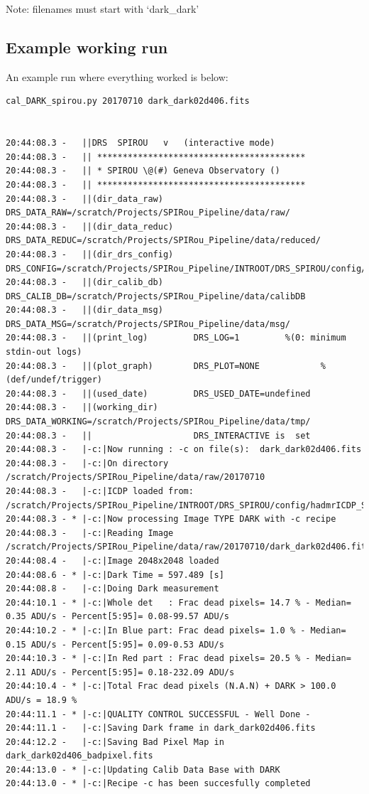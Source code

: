\noindent Note: filenames must start with `dark\_dark'

\subsection{Example working run}

An example run where everything worked is below:

\begin{lstlisting}[style=text]
cal_DARK_spirou.py 20170710 dark_dark02d406.fits


20:44:08.3 -   ||DRS  SPIROU   v   (interactive mode)
20:44:08.3 -   || *****************************************
20:44:08.3 -   || * SPIROU \@(#) Geneva Observatory ()
20:44:08.3 -   || *****************************************
20:44:08.3 -   ||(dir_data_raw)      DRS_DATA_RAW=/scratch/Projects/SPIRou_Pipeline/data/raw/
20:44:08.3 -   ||(dir_data_reduc)    DRS_DATA_REDUC=/scratch/Projects/SPIRou_Pipeline/data/reduced/
20:44:08.3 -   ||(dir_drs_config)    DRS_CONFIG=/scratch/Projects/SPIRou_Pipeline/INTROOT/DRS_SPIROU/config/
20:44:08.3 -   ||(dir_calib_db)      DRS_CALIB_DB=/scratch/Projects/SPIRou_Pipeline/data/calibDB
20:44:08.3 -   ||(dir_data_msg)      DRS_DATA_MSG=/scratch/Projects/SPIRou_Pipeline/data/msg/
20:44:08.3 -   ||(print_log)         DRS_LOG=1         %(0: minimum stdin-out logs)
20:44:08.3 -   ||(plot_graph)        DRS_PLOT=NONE            %(def/undef/trigger)
20:44:08.3 -   ||(used_date)         DRS_USED_DATE=undefined
20:44:08.3 -   ||(working_dir)       DRS_DATA_WORKING=/scratch/Projects/SPIRou_Pipeline/data/tmp/
20:44:08.3 -   ||                    DRS_INTERACTIVE is  set
20:44:08.3 -   |-c:|Now running : -c on file(s):  dark_dark02d406.fits
20:44:08.3 -   |-c:|On directory /scratch/Projects/SPIRou_Pipeline/data/raw/20170710
20:44:08.3 -   |-c:|ICDP loaded from: /scratch/Projects/SPIRou_Pipeline/INTROOT/DRS_SPIROU/config/hadmrICDP_SPIROU.py
20:44:08.3 - * |-c:|Now processing Image TYPE DARK with -c recipe
20:44:08.3 -   |-c:|Reading Image /scratch/Projects/SPIRou_Pipeline/data/raw/20170710/dark_dark02d406.fits
20:44:08.4 -   |-c:|Image 2048x2048 loaded
20:44:08.6 - * |-c:|Dark Time = 597.489 [s]
20:44:08.8 -   |-c:|Doing Dark measurement
20:44:10.1 - * |-c:|Whole det   : Frac dead pixels= 14.7 % - Median= 0.35 ADU/s - Percent[5:95]= 0.08-99.57 ADU/s
20:44:10.2 - * |-c:|In Blue part: Frac dead pixels= 1.0 % - Median= 0.15 ADU/s - Percent[5:95]= 0.09-0.53 ADU/s
20:44:10.3 - * |-c:|In Red part : Frac dead pixels= 20.5 % - Median= 2.11 ADU/s - Percent[5:95]= 0.18-232.09 ADU/s
20:44:10.4 - * |-c:|Total Frac dead pixels (N.A.N) + DARK > 100.0 ADU/s = 18.9 %
20:44:11.1 - * |-c:|QUALITY CONTROL SUCCESSFUL - Well Done -
20:44:11.1 -   |-c:|Saving Dark frame in dark_dark02d406.fits                                                                                      
20:44:12.2 -   |-c:|Saving Bad Pixel Map in dark_dark02d406_badpixel.fits                                                                            
20:44:13.0 - * |-c:|Updating Calib Data Base with DARK                                                                                                  
20:44:13.0 - * |-c:|Recipe -c has been succesfully completed


\end{lstlisting}
